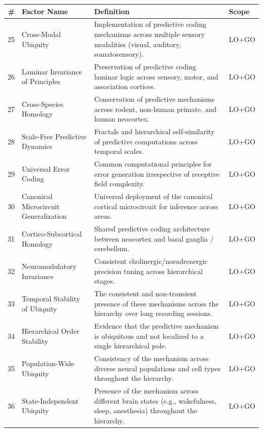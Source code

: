 \documentclass[12pt]{article}
\providecommand{\DIFaddbegin}{} %
\providecommand{\DIFaddincludegraphics}[2][]{{\color{blue}\fbox{\DIFOincludegraphics[#1]{#2}}}} %
\DeclareRobustCommand{\DIFaddbegin}{\DIFOaddbegin \let\includegraphics\DIFaddincludegraphics} %
\begin{document}
\DIFaddbegin \begingroup
\small
\noindent\begin{tabularx}{\textwidth}{@{}r p{1.9in} >{\raggedright\arraybackslash}X l@{}}
\toprule
\textbf{\#} & \textbf{Factor Name} & \textbf{Definition} & \textbf{Scope} \\
\midrule
25 & Cross-Modal Ubiquity & Implementation of predictive coding mechanisms across multiple sensory modalities (visual, auditory, somatosensory). & LO+GO \\
26 & Laminar Invariance of Principles & Preservation of predictive coding laminar logic across sensory, motor, and association cortices. & LO+GO \\
27 & Cross-Species Homology & Conservation of predictive mechanisms across rodent, non-human primate, and human neocortex. & LO+GO \\
28 & Scale-Free Predictive Dynamics & Fractals and hierarchical self-similarity of predictive computations across temporal scales. & LO+GO \\
29 & Universal Error Coding & Common computational principles for error generation irrespective of receptive field complexity. & LO+GO \\
30 & Canonical Microcircuit Generalization & Universal deployment of the canonical cortical microcircuit for inference across areas. & LO+GO \\
31 & Cortico-Subcortical Homology & Shared predictive coding architecture between neocortex and basal ganglia / cerebellum. & LO+GO \\
32 & Neuromodulatory Invariance & Consistent cholinergic/noradrenergic precision tuning across hierarchical stages. & LO+GO \\
33 & Temporal Stability of Ubiquity & The consistent and non-transient presence of these mechanisms across the hierarchy over long recording sessions. & LO+GO \\
34 & Hierarchical Order Stability & Evidence that the predictive mechanism is ubiquitous and not localized to a single hierarchical pole. & LO+GO \\
35 & Population-Wide Ubiquity & Consistency of the mechanism across diverse neural populations and cell types throughout the hierarchy. & LO+GO \\
36 & State-Independent Ubiquity & Presence of the mechanism across different brain states (e.g., wakefulness, sleep, anesthesia) throughout the hierarchy. & LO+GO \\
\bottomrule
\end{tabularx}
\endgroup
\vspace{0.4em}
\end{document}
